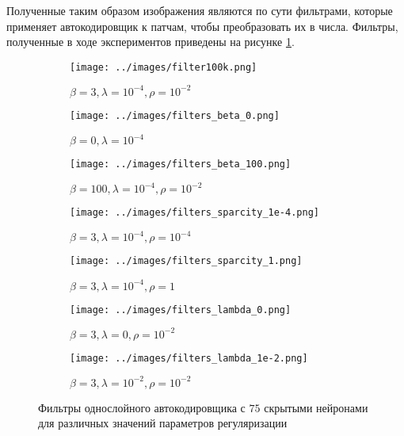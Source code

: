 \documentclass[12pt]{article}
\begin{document}
		Полученные таким образом изображения являются по сути фильтрами, которые применяет автокодировщик к патчам, чтобы преобразовать их в числа. Фильтры, полученные в ходе экспериментов приведены на рисунке \ref{filters}.

		\begin{figure}[!b]
			\centering
			\begin{subfigure}[b]{0.6\textwidth}
		            \texttt{[image: ../images/filter100k.png]}
				\caption{\scriptsize $\beta = 3, \lambda = 10^{-4}, \rho = 10^{-2}$}
			\end{subfigure}
			\vspace{0.5cm}
			
			\begin{subfigure}[b]{0.3\textwidth}
		            \texttt{[image: ../images/filters\_beta\_0.png]}
				\caption{\scriptsize$\beta = 0, \lambda = 10^{-4}$}
			\end{subfigure}
			\begin{subfigure}[b]{0.3\textwidth}
		            \texttt{[image: ../images/filters\_beta\_100.png]}
				\caption{\scriptsize$\beta = 100, \lambda = 10^{-4}, \rho = 10^{-2}$}
			\end{subfigure}
			\vspace{0.5cm}

			\begin{subfigure}[b]{0.3\textwidth}
		            \texttt{[image: ../images/filters\_sparcity\_1e-4.png]}
				\caption{\scriptsize$\beta = 3, \lambda = 10^{-4}, \rho = 10^{-4}$}
			\end{subfigure}
			\begin{subfigure}[b]{0.3\textwidth}
		            \texttt{[image: ../images/filters\_sparcity\_1.png]}
				\caption{\scriptsize$\beta = 3, \lambda = 10^{-4}, \rho = 1$}
			\end{subfigure}
			\vspace{0.5cm}

			\begin{subfigure}[b]{0.3\textwidth}
		            \texttt{[image: ../images/filters\_lambda\_0.png]}
				\caption{\scriptsize$\beta = 3, \lambda = 0, \rho = 10^{-2}$}
			\end{subfigure}
			\begin{subfigure}[b]{0.3\textwidth}
		            \texttt{[image: ../images/filters\_lambda\_1e-2.png]}
				\caption{\scriptsize$\beta = 3, \lambda = 10^{-2}, \rho = 10^{-2}$}
			\end{subfigure}

			\caption{Фильтры однослойного автокодировщика с $75$ скрытыми нейронами для различных значений параметров регуляризации}
			\label{filters}
		\end{figure}
\end{document}
